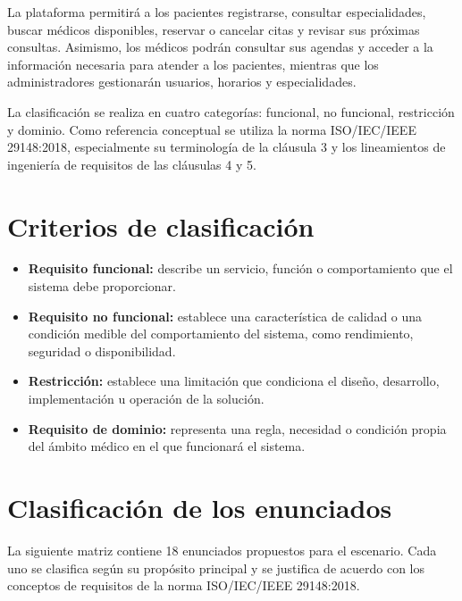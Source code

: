 \documentclass[12pt,a4paper]{article}
\begin{document}
La plataforma permitirá a los pacientes registrarse, consultar especialidades, buscar médicos disponibles, reservar o cancelar citas y revisar sus próximas consultas. Asimismo, los médicos podrán consultar sus agendas y acceder a la información necesaria para atender a los pacientes, mientras que los administradores gestionarán usuarios, horarios y especialidades.

La clasificación se realiza en cuatro categorías: funcional, no funcional, restricción y dominio. Como referencia conceptual se utiliza la norma ISO/IEC/IEEE 29148:2018, especialmente su terminología de la cláusula 3 y los lineamientos de ingeniería de requisitos de las cláusulas 4 y 5.

\section{Criterios de clasificación}

\begin{itemize}
    \item \textbf{Requisito funcional:} describe un servicio, función o comportamiento que el sistema debe proporcionar.
    \item \textbf{Requisito no funcional:} establece una característica de calidad o una condición medible del comportamiento del sistema, como rendimiento, seguridad o disponibilidad.
    \item \textbf{Restricción:} establece una limitación que condiciona el diseño, desarrollo, implementación u operación de la solución.
    \item \textbf{Requisito de dominio:} representa una regla, necesidad o condición propia del ámbito médico en el que funcionará el sistema.
\end{itemize}

\section{Clasificación de los enunciados}

La siguiente matriz contiene 18 enunciados propuestos para el escenario. Cada uno se clasifica según su propósito principal y se justifica de acuerdo con los conceptos de requisitos de la norma ISO/IEC/IEEE 29148:2018.
\end{document}
